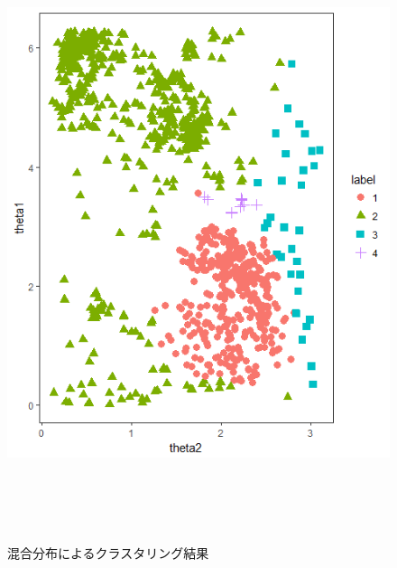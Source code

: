 \documentclass[a4j,12pt]{jarticle}
\begin{document}
\begin{figure}[tbp]
\begin{center}
\includegraphics[clip,height= 180mm]{data/cluster_4.png}
\end{center}
 \vspace{-0.9cm}
\caption{混合分布によるクラスタリング結果}
\label{clusterplot}
\end{figure}
\end{document}
